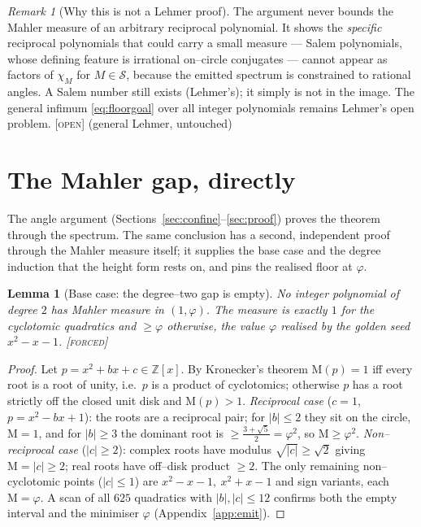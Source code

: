 \documentclass[11pt]{article}
\theoremstyle{plain}
\newtheorem{lemma}[theorem]{Lemma}
\theoremstyle{definition}
\theoremstyle{remark}
\newtheorem{remark}[theorem]{Remark}
\newcommand{\forced}{\textcolor{forcedc}{\textsc{[forced]}}}
\newcommand{\openq}{\textcolor{openc}{\textsc{[open]}}}
\newcommand{\Z}{\mathbb{Z}}
\newcommand{\Mah}{\mathrm{M}}
\newcommand{\charp}{\chi}
\newcommand{\abs}[1]{\left\lvert #1 \right\rvert}
\newcommand{\Scal}{\mathcal{S}}
\begin{document}
\begin{remark}[Why this is not a Lehmer proof]\label{rem:notlehmer}
The argument never bounds the Mahler measure of an arbitrary reciprocal polynomial. It shows the \emph{specific} reciprocal polynomials that could carry a small measure --- Salem polynomials, whose defining feature is irrational on--circle conjugates --- cannot appear as factors of $\charp_M$ for $M\in\Scal$, because the emitted spectrum is constrained to rational angles. A Salem number still exists (Lehmer's); it simply is not in the image. The general infimum \eqref{eq:floorgoal} over all integer polynomials remains Lehmer's open problem. \openq{} (general Lehmer, untouched)
\end{remark}

\section{The Mahler gap, directly}\label{sec:mahlergap}

The angle argument (Sections~\ref{sec:confine}--\ref{sec:proof}) proves the theorem through the spectrum. The same conclusion has a second, independent proof through the Mahler measure itself; it supplies the base case and the degree induction that the height form rests on, and pins the realised floor at $\varphi$.

\begin{lemma}[Base case: the degree--two gap is empty]\label{lem:base}
No integer polynomial of degree $2$ has Mahler measure in $(1,\varphi)$. The measure is exactly $1$ for the cyclotomic quadratics and $\ge\varphi$ otherwise, the value $\varphi$ realised by the golden seed $x^2-x-1$. \forced
\end{lemma}

\begin{proof}
Let $p=x^2+bx+c\in\Z[x]$. By Kronecker's theorem $\Mah(p)=1$ iff every root is a root of unity, i.e.\ $p$ is a product of cyclotomics; otherwise $p$ has a root strictly off the closed unit disk and $\Mah(p)>1$. \emph{Reciprocal case} ($c=1$, $p=x^2-bx+1$): the roots are a reciprocal pair; for $\abs b\le2$ they sit on the circle, $\Mah=1$, and for $\abs b\ge3$ the dominant root is $\ge\tfrac{3+\sqrt5}2=\varphi^2$, so $\Mah\ge\varphi^2$. \emph{Non--reciprocal case} ($\abs c\ge2$): complex roots have modulus $\sqrt{\abs c}\ge\sqrt2$ giving $\Mah=\abs c\ge2$; real roots have off--disk product $\ge2$. The only remaining non--cyclotomic points ($\abs c\le1$) are $x^2-x-1,\ x^2+x-1$ and sign variants, each $\Mah=\varphi$. A scan of all $625$ quadratics with $\abs b,\abs c\le12$ confirms both the empty interval and the minimiser $\varphi$ (Appendix~\ref{app:emit}). \end{proof}
\end{document}
